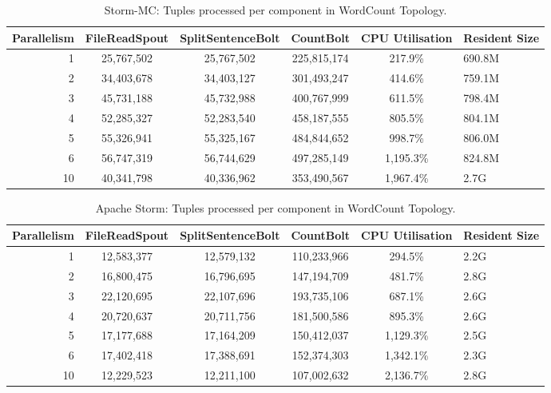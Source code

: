 \documentclass[bsc,logo,frontabs,twoside,singlespacing,normalheadings,parskip]{infthesis}\usepackage[]{graphicx}\usepackage[]{color}
\begin{document}
\begin{table}[!htb]
\begin{adjustwidth}{-0.5in}{-0.5in}
\centering
\small
\begin{tabular}{@{}rccccl@{}}
    \textbf{Parallelism} & \textbf{FileReadSpout} & \textbf{SplitSentenceBolt} & \textbf{CountBolt} & \textbf{CPU Utilisation} & \textbf{Resident Size} \\ \toprule
    1 & {25,767,502} & {25,767,502} & {225,815,174} & {217.9\%} & {690.8M} \\
    2 & {34,403,678} & {34,403,127} & {301,493,247} & {414.6\%} & {759.1M} \\
    3 & {45,731,188} & {45,732,988} & {400,767,999} & {611.5\%} & {798.4M} \\
    4 & {52,285,327} & {52,283,540} & {458,187,555} & {805.5\%} & {804.1M} \\
	5 & {55,326,941} & {55,325,167} & {484,844,652} & {998.7\%} & {806.0M} \\
	6 & {56,747,319} & {56,744,629} & {497,285,149} & {1,195.3\%} & {824.8M} \\
	10 & {40,341,798} & {40,336,962} & {353,490,567} & {1,967.4\%} & {2.7G} \\
\end{tabular}
\caption{Storm-MC: Tuples processed per component in WordCount Topology.}
\label{table:storm_mc_wordcount}
\end{adjustwidth}
\end{table}

\begin{table}[!htb]
\begin{adjustwidth}{-0.5in}{-0.5in}
\centering
\small
\begin{tabular}{@{}rccccl@{}}
    \textbf{Parallelism} & \textbf{FileReadSpout} & \textbf{SplitSentenceBolt} & \textbf{CountBolt} & \textbf{CPU Utilisation} & \textbf{Resident Size} \\ \toprule
    1 & {12,583,377} & {12,579,132} & {110,233,966} & {294.5\%} & {2.2G} \\
    2 & {16,800,475} & {16,796,695} & {147,194,709} & {481.7\%} & {2.8G} \\
    3 & {22,120,695} & {22,107,696} & {193,735,106} & {687.1\%} & {2.6G} \\
    4 & {20,720,637} & {20,711,756} & {181,500,586} & {895.3\%} & {2.6G} \\
	5 & {17,177,688} & {17,164,209} & {150,412,037} & {1,129.3\%} & {2.5G} \\
	6 & {17,402,418} & {17,388,691} & {152,374,303} & {1,342.1\%} & {2.3G} \\
	10 & {12,229,523} & {12,211,100} & {107,002,632} & {2,136.7\%} & {2.8G} \\
\end{tabular}
\caption{Apache Storm: Tuples processed per component in WordCount Topology.}
\label{table:storm_wordcount}
\end{adjustwidth}
\end{table}
\end{document}
